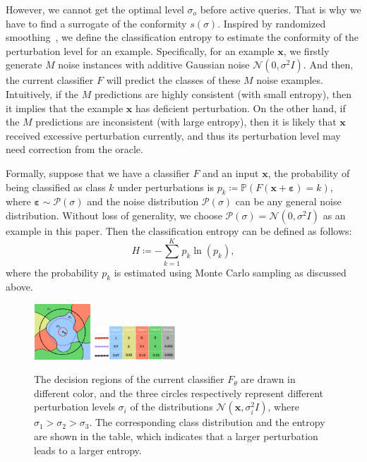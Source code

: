 \documentclass[letterpaper]{article} %
\begin{document}
However, we cannot get the optimal level $\sigma_o$ before active queries. That is why we have to find a surrogate of the conformity $s(\sigma)$.
Inspired by randomized smoothing~\cite{cohen2019certified}, we define the classification entropy to estimate the conformity of the perturbation level for an example. Specifically, for an example $\mathbf{x}$, we firstly generate $M$ noise instances with additive Gaussian noise $\mathcal{N}(0,\sigma^2 I)$. And then, the current classifier $F$ will predict the classes of these $M$ noise examples. Intuitively, if the $M$ predictions are highly consistent (with small entropy), then it implies that the example $\mathbf{x}$ has deficient perturbation. On the other hand, if the $M$ predictions are inconsistent (with large entropy), then it is likely that $\mathbf{x}$ received excessive perturbation currently, and thus its perturbation level may need correction from the oracle.

Formally, suppose that we have a classifier $F$ and an input $\mathbf{x}$, the probability of being classified as class $k$ under perturbations is $p_k \coloneqq \mathbb{P}(F(\mathbf{x}+\boldsymbol{\varepsilon})=k)$, where $\boldsymbol{\varepsilon} \sim \mathcal{P}(\sigma)$ and the noise distribution $\mathcal{P}(\sigma)$ can be any general noise distribution. Without loss of generality, we choose $\mathcal{P}(\sigma) = \mathcal{N}(0, \sigma^{2} I)$ as an example in this paper. Then the classification entropy can be defined as follows:
\begin{equation}\label{Eq:entropy}
H \coloneqq -\sum_{k=1}^{K} p_k \operatorname{ln}(p_k),
\end{equation}
where the probability $p_k$ is estimated using Monte Carlo sampling as discussed above.

\begin{figure}[t]
	\begin{center}
		\includegraphics[width=0.19\textwidth]{img/classificationEntropy-1.pdf}
		\includegraphics[width=0.27\textwidth]{img/classificationEntropy2-1.jpg}
	\end{center}
	\caption{The decision regions of the current classifier $F_\theta$ are drawn in different color, and the three circles respectively represent different perturbation levels $\sigma_i$ of the distributions $\mathcal{N}(\mathbf{x}, \sigma_i^2I)$, where $\sigma_1 > \sigma_2 > \sigma_3$. The corresponding class distribution and the entropy are shown in the table, which indicates that a larger perturbation leads to a larger entropy.}
	\label{fig:intuitionAndTheroy}
\end{figure}
\end{document}

